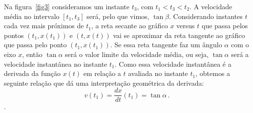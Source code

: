 \documentclass[12pt, a4paper]{article}
\begin{document}
Na figura~\ref{fig3} consideramos um instante $t_3$, com $t_1<t_3<t_2$. A velocidade média no intervalo $[t_1,t_3]$ será, pelo que vimos, $\tan\beta$. Considerando instantes $t$ cada vez mais próximos de $t_1$, a reta secante ao gráfico $x$ versus $t$ que passa pelos pontos $(t_1,x(t_1))$ e $(t,x(t))$ vai se aproximar da reta tangente ao gráfico que passa pelo ponto $(t_1,x(t_1))$. Se essa reta tangente faz um ângulo $\alpha$ com o eixo $x$, então $\tan\alpha$ será o valor limite da velocidade média, ou seja, $\tan\alpha$ será a velocidade instantânea no instante $t_1$. Como essa velocidade instantânea é a derivada da função $x(t)$ em relação a $t$ avaliada no instante $t_1$, obtemos a seguinte relação que dá uma interpretação geométrica da derivada:
$$v(t_1)=\frac{dx}{dt}(t_1)=\tan\alpha\,.$$.
\end{document}
